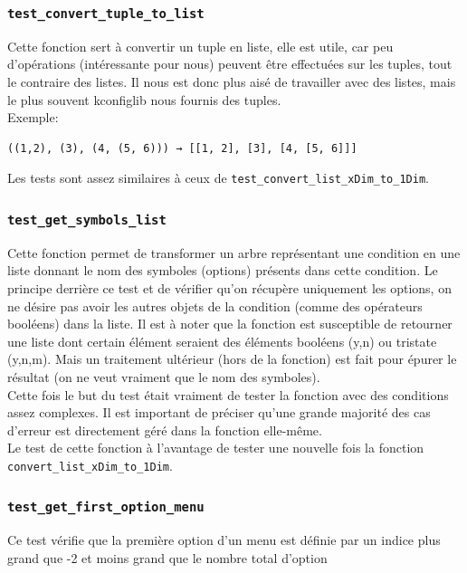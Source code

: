 \documentclass[17pts]{report}
\begin{document}
\subsubsection{\texttt{test\_convert\_tuple\_to\_list}}
\label{ssub:ConvertTupleToList}
Cette fonction sert à convertir un tuple en liste, elle est utile, car peu
d'opérations (intéressante pour nous) peuvent être effectuées sur les tuples,
tout le contraire des listes. Il nous est donc plus aisé de travailler avec des
listes, mais le plus souvent kconfiglib nous fournis des tuples.
\\
Exemple:
\begin{verbatim}
((1,2), (3), (4, (5, 6))) → [[1, 2], [3], [4, [5, 6]]]
\end{verbatim}

Les tests sont assez similaires à ceux de
\verb|test_convert_list_xDim_to_1Dim|. \\

\subsubsection{\texttt{test\_get\_symbols\_list}}
\label{ssub:TestGetSymbolsList}
Cette fonction permet de transformer un arbre représentant une condition en une
liste donnant le nom des symboles (options) présents dans cette condition. Le
principe derrière ce test et de vérifier qu'on récupère uniquement les options,
on ne désire pas avoir les autres objets de la condition (comme des opérateurs
booléens) dans la liste.  Il est à noter que la fonction est susceptible de
retourner une liste dont certain élément seraient des éléments booléens (y,n)
ou tristate (y,n,m).  Mais un traitement ultérieur (hors de la fonction) est
fait pour épurer le résultat (on ne veut vraiment que le nom des symboles).\\

Cette fois le but du test était vraiment de tester la fonction avec des
conditions assez complexes. Il est important de préciser qu'une grande majorité
des cas d'erreur est directement géré dans la fonction elle-même.\\

Le test de cette fonction à l'avantage de tester une nouvelle fois la fonction
\verb|convert_list_xDim_to_1Dim|.

\subsubsection{\texttt{test\_get\_first\_option\_menu}}
\label{ssub:TestGetFirstOptionMenu}
Ce test vérifie que la première option d'un menu est définie par un indice
plus grand que -2 et moins grand que le nombre total d'option
\end{document}
